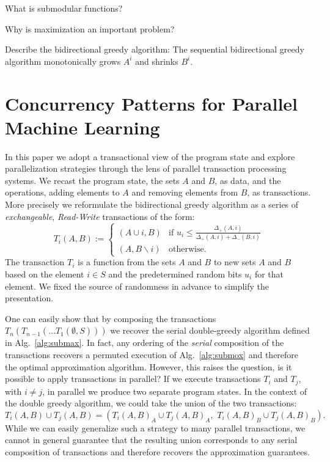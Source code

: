 \documentclass{article} %
\newcommand{\algref}[1]{Alg.~\ref{#1}}
\newcommand{\union}{\cup}
\begin{document}
What is submodular functions?

Why is maximization an important problem?

Describe the bidirectional greedy algorithm:
The sequential bidirectional greedy \cite{buchbinder2012} algorithm monotonically grows $A^i$ and shrinks $B^i$.









\section{Concurrency Patterns for Parallel Machine Learning}

In this paper we adopt a transactional view of the program state and explore parallelization strategies through the lens of parallel transaction processing systems.
We recast the program state, the sets $A$ and $B$, as data, and the operations, adding elements to $A$ and removing elements from $B$, as transactions.
More precisely we reformulate the bidirectional greedy algorithm as a series of \emph{exchangeable}, \emph{Read-Write} transactions of the form:
\begin{equation}
T_i(A,B) :=
\begin{cases}
   (A \union i, B) & \text{if } u_i \leq \frac{\Delta_+(A,i)}{\Delta_+(A,i)+ \Delta_-(B,i)}  \\
   (A, B \backslash i) & \text{otherwise. }
  \end{cases}
\end{equation}
The transaction $T_i$ is a function from the sets $A$ and $B$ to new sets $A$ and $B$ based on the element $i \in S$ and the predetermined random bits $u_i$ for that element.
We fixed the source of randomness in advance to simplify the presentation.


One can easily show that by composing the transactions $T_n (T_{n-1}(\ldots T_1(\emptyset, S)))$ we recover the serial double-greedy algorithm defined in \algref{alg:submax}.
In fact, any ordering of the \emph{serial} composition of the transactions recovers a permuted execution of \algref{alg:submox} and therefore the optimal approximation algorithm.
However, this raises the question, is it possible to apply transactions in parallel?
If we execute transactions $T_i$ and $T_j$, with $i \neq j$, in parallel we produce two separate program states.
In the context of the double greedy algorithm, we could take the union of the two transactions:
\begin{equation}
T_i(A,B) \union T_j(A,B) = \left(T_i(A,B)_A \union T_j(A,B)_A,  \,\, T_i(A,B)_B  \union T_j(A,B)_B \right).
\end{equation}
While we can easily generalize such a strategy to many parallel transactions, we cannot in general guarantee that the resulting union corresponds to any serial composition of transactions and therefore recovers the approximation guarantees.
\end{document}
